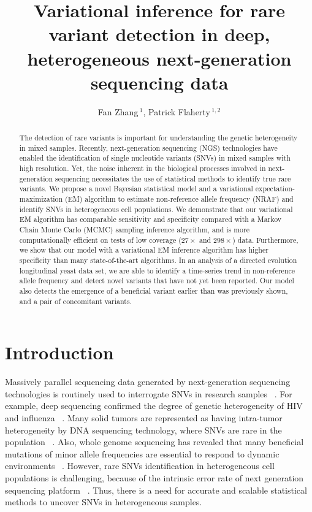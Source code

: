 \documentclass[11pt,reqno]{amsart}
\title[VI for RVD]{Variational inference for rare variant detection in deep, heterogeneous next-generation sequencing data}
\author[F. Zhang AND P. Flaherty]{Fan Zhang\,$^{1}$, Patrick Flaherty\,$^{1,2}$}
\begin{document}
\maketitle

\begin{abstract}
  The detection of rare variants is important for understanding the genetic heterogeneity in mixed samples.
Recently, next-generation sequencing (NGS) technologies have enabled the identification of single nucleotide variants (SNVs) in mixed samples with high resolution.
Yet, the noise inherent in the biological processes involved in next-generation sequencing necessitates the use of statistical methods to identify true rare variants.
We propose a novel Bayesian statistical model and a variational expectation-maximization (EM) algorithm to estimate non-reference allele frequency (NRAF) and identify SNVs in heterogeneous cell populations.
We demonstrate that our variational EM algorithm has comparable sensitivity and specificity compared with a Markov Chain Monte Carlo (MCMC) sampling inference algorithm, and is more computationally efficient on tests of low coverage ($27\times$ and $298\times$) data.
Furthermore, we show that our model with a variational EM inference algorithm has higher specificity than many state-of-the-art algorithms.
In an analysis of a directed evolution longitudinal yeast data set, we are able to identify a time-series trend in non-reference allele frequency and detect novel variants that have not yet been reported.
Our model also detects the emergence of a beneficial variant earlier than was previously shown, and a pair of concomitant variants.
\end{abstract}

\section{Introduction}
Massively parallel sequencing data generated by next-generation sequencing technologies is routinely used to interrogate SNVs in research samples ~\citep{koboldt2013next}.
For example, deep sequencing confirmed the degree of genetic heterogeneity of HIV and influenza ~\citep{flaherty2011ultrasensitive, ghedin2011deep}.
Many solid tumors are represented as having intra-tumor heterogeneity by DNA sequencing technology, where SNVs are rare in the population ~\citep{navin2010inferring}.
Also, whole genome sequencing has revealed that many beneficial mutations of minor allele frequencies are essential to respond to dynamic environments ~\citep{kvitek2013whole}.
However, rare SNVs identification in heterogeneous cell populations is challenging, because of the intrinsic error rate of next generation sequencing platform ~\citep{shendure2008next}.
Thus, there is a need for accurate and scalable statistical methods to uncover SNVs in heterogeneous samples.
\end{document}
